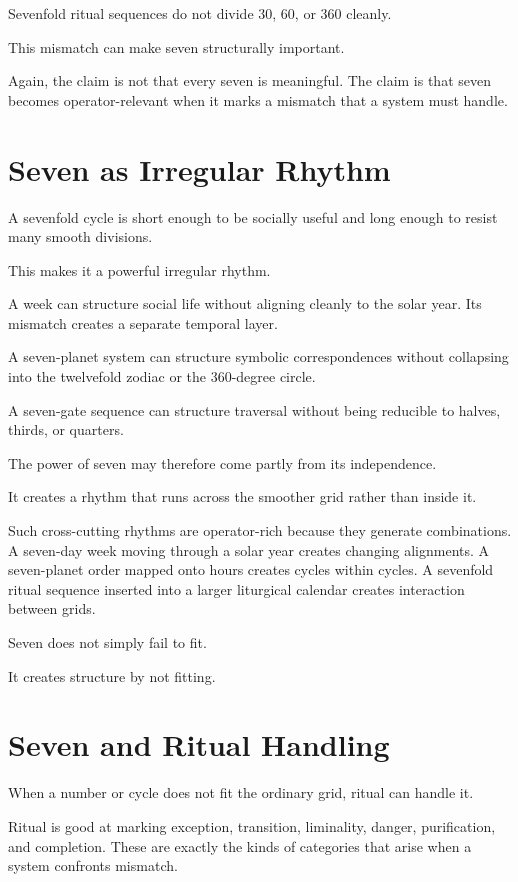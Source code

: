 \documentclass[11pt]{book}
\begin{document}
Sevenfold ritual sequences do not divide \(30\), \(60\), or \(360\) cleanly.

This mismatch can make seven structurally important.

Again, the claim is not that every seven is meaningful. The claim is that seven becomes operator-relevant when it marks a mismatch that a system must handle.

\section{Seven as Irregular Rhythm}

A sevenfold cycle is short enough to be socially useful and long enough to resist many smooth divisions.

This makes it a powerful irregular rhythm.

A week can structure social life without aligning cleanly to the solar year. Its mismatch creates a separate temporal layer.

A seven-planet system can structure symbolic correspondences without collapsing into the twelvefold zodiac or the \(360\)-degree circle.

A seven-gate sequence can structure traversal without being reducible to halves, thirds, or quarters.

The power of seven may therefore come partly from its independence.

It creates a rhythm that runs across the smoother grid rather than inside it.

Such cross-cutting rhythms are operator-rich because they generate combinations. A seven-day week moving through a solar year creates changing alignments. A seven-planet order mapped onto hours creates cycles within cycles. A sevenfold ritual sequence inserted into a larger liturgical calendar creates interaction between grids.

Seven does not simply fail to fit.

It creates structure by not fitting.

\section{Seven and Ritual Handling}

When a number or cycle does not fit the ordinary grid, ritual can handle it.

Ritual is good at marking exception, transition, liminality, danger, purification, and completion. These are exactly the kinds of categories that arise when a system confronts mismatch.
\end{document}
